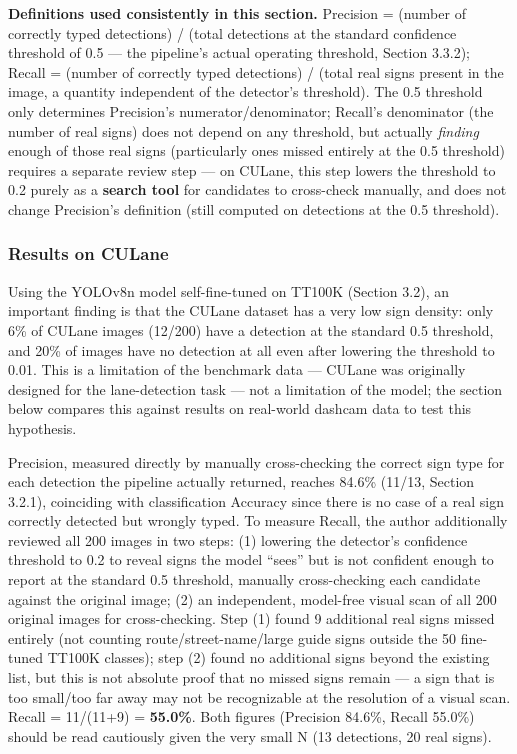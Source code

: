 \documentclass[12pt,a4paper]{report}
\begin{document}
\textbf{Definitions used consistently in this section.} Precision = (number of correctly typed detections) / (total detections at the standard confidence threshold of 0.5 --- the pipeline's actual operating threshold, Section 3.3.2); Recall = (number of correctly typed detections) / (total real signs present in the image, a quantity independent of the detector's threshold). The 0.5 threshold only determines Precision's numerator/denominator; Recall's denominator (the number of real signs) does not depend on any threshold, but actually \textit{finding} enough of those real signs (particularly ones missed entirely at the 0.5 threshold) requires a separate review step --- on CULane, this step lowers the threshold to 0.2 purely as a \textbf{search tool} for candidates to cross-check manually, and does not change Precision's definition (still computed on detections at the 0.5 threshold).

\subsubsection*{Results on CULane}

Using the YOLOv8n model self-fine-tuned on TT100K (Section 3.2), an important finding is that the CULane dataset has a very low sign density: only 6\% of CULane images (12/200) have a detection at the standard 0.5 threshold, and 20\% of images have no detection at all even after lowering the threshold to 0.01. This is a limitation of the benchmark data --- CULane was originally designed for the lane-detection task --- not a limitation of the model; the section below compares this against results on real-world dashcam data to test this hypothesis.

Precision, measured directly by manually cross-checking the correct sign type for each detection the pipeline actually returned, reaches 84.6\% (11/13, Section 3.2.1), coinciding with classification Accuracy since there is no case of a real sign correctly detected but wrongly typed. To measure Recall, the author additionally reviewed all 200 images in two steps: (1) lowering the detector's confidence threshold to 0.2 to reveal signs the model ``sees'' but is not confident enough to report at the standard 0.5 threshold, manually cross-checking each candidate against the original image; (2) an independent, model-free visual scan of all 200 original images for cross-checking. Step (1) found 9 additional real signs missed entirely (not counting route/street-name/large guide signs outside the 50 fine-tuned TT100K classes); step (2) found no additional signs beyond the existing list, but this is not absolute proof that no missed signs remain --- a sign that is too small/too far away may not be recognizable at the resolution of a visual scan. Recall = 11/(11+9) = \textbf{55.0\%}. Both figures (Precision 84.6\%, Recall 55.0\%) should be read cautiously given the very small N (13 detections, 20 real signs).
\end{document}
